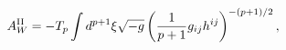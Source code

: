 \begin{equation}
A^{{\rm II}}_{W}=-T_{p}\int d^{p+1}{\xi}\sqrt{-g}\left(\frac{1}{p+1}g_{ij}
h^{ij}\right)^{-(p+1)/2},
\end{equation}

